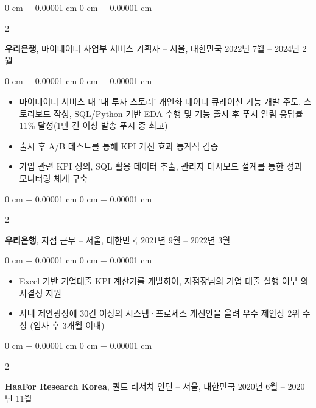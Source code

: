 \documentclass[10pt, letterpaper]{article}
\newenvironment{highlights}{
    \begin{itemize}[
        topsep=0.10 cm,
        parsep=0.10 cm,
        partopsep=0pt,
        itemsep=0pt,
        leftmargin=0 cm + 10pt
    ]
}{
    \end{itemize}
}
\newenvironment{onecolentry}{
    \begin{adjustwidth}{
        0 cm + 0.00001 cm
    }{
        0 cm + 0.00001 cm
    }
}{
    \end{adjustwidth}
}
\newenvironment{twocolentry}[2][]{
    \onecolentry
    \def\secondColumn{#2}
    \setcolumnwidth{\fill, 4.5 cm}
    \begin{paracol}{2}
}{
    \switchcolumn \raggedleft \secondColumn
    \end{paracol}
    \endonecolentry
}
\begin{document}
        \vspace{0.2 cm}

        \begin{twocolentry}{
            2022년 7월 – 2024년 2월
        }
            \textbf{우리은행}, 마이데이터 사업부 서비스 기획자 -- 서울, 대한민국\end{twocolentry}

        \vspace{0.10 cm}
        \begin{onecolentry}
            \begin{highlights}
                \item 마이데이터 서비스 내 '내 투자 스토리' 개인화 데이터 큐레이션 기능 개발 주도. 스토리보드 작성, SQL/Python 기반 EDA 수행 및 기능 출시 후 푸시 알림 응답률 11\% 달성(1만 건 이상 발송 푸시 중 최고)
                \item 출시 후 A/B 테스트를 통해 KPI 개선 효과 통계적 검증
                \item 가입 관련 KPI 정의, SQL 활용 데이터 추출, 관리자 대시보드 설계를 통한 성과 모니터링 체계 구축
            \end{highlights}
        \end{onecolentry}


        \vspace{0.2 cm}

        \begin{twocolentry}{
            2021년 9월 – 2022년 3월
        }
            \textbf{우리은행}, 지점 근무 -- 서울, 대한민국\end{twocolentry}

        \vspace{0.10 cm}
        \begin{onecolentry}
            \begin{highlights}
                \item Excel 기반 기업대출 KPI 계산기를 개발하여, 지점장님의 기업 대출 실행 여부 의사결정 지원
                \item 사내 제안광장에 30건 이상의 시스템·프로세스 개선안을 올려 우수 제안상 2위 수상 (입사 후 3개월 이내)
            \end{highlights}
        \end{onecolentry}


        \vspace{0.2 cm}

        \begin{twocolentry}{
            2020년 6월 – 2020년 11월
        }
            \textbf{HaaFor Research Korea}, 퀀트 리서치 인턴 -- 서울, 대한민국\end{twocolentry}
\end{document}
